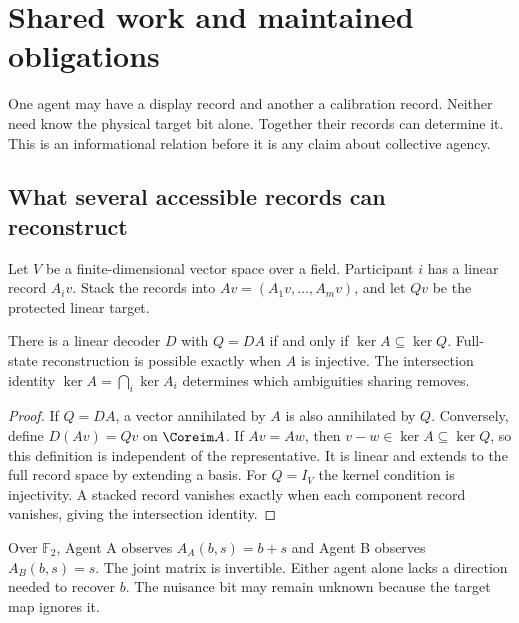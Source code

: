 \chapter{Shared work and maintained obligations}\label{Core:book:chapter-8}
\setcounter{section}{0}\label{Core:ch:shared}
One agent may have a display record and another a calibration record. Neither need know the physical target bit alone. Together their records can determine it. This is an informational relation before it is any claim about collective agency.

\section{What several accessible records can reconstruct}
Let $V$ be a finite-dimensional vector space over a field. Participant $i$ has a linear record $A_i v$. Stack the records into $Av=(A_1v,\ldots,A_mv)$, and let $Qv$ be the protected linear target.

\begin{Coreproposition}\label{Core:r:reconstruction}
There is a linear decoder $D$ with $Q=DA$ if and only if $\ker A\subseteq\ker Q$. Full-state reconstruction is possible exactly when $A$ is injective. The intersection identity $\ker A=\bigcap_i\ker A_i$ determines which ambiguities sharing removes.
\end{Coreproposition}
\begin{proof}
If $Q=DA$, a vector annihilated by $A$ is also annihilated by $Q$. Conversely, define $D(Av)=Qv$ on $\Coreim A$. If $Av=Aw$, then $v-w\in\ker A\subseteq\ker Q$, so this definition is independent of the representative. It is linear and extends to the full record space by extending a basis. For $Q=I_V$ the kernel condition is injectivity. A stacked record vanishes exactly when each component record vanishes, giving the intersection identity.
\end{proof}

Over $\mathbb F_2$, Agent A observes $A_A(b,s)=b+s$ and Agent B observes $A_B(b,s)=s$. The joint matrix is invertible. Either agent alone lacks a direction needed to recover $b$. The nuisance bit may remain unknown because the target map ignores it.

